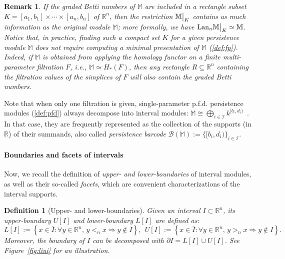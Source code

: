 \documentclass{article}
\newcommand{\field}{k}
\newcommand{\barcode}[1]{ {\mathcal B}\left(#1\right) }
\newcommand{\induced}[1]{\field^{#1}}
\newcommand{\R}{\mathbb{R}}
\newcommand{\Mbb}{\mathbb{M}}
\newcommand{\sln}{<_n}
\newcommand{\sgn}{>_n}
\newcommand{\upperb}[1]{ U[#1] }
\newcommand{\lowerb}[1]{ L[#1] }
\newcommand\restr[2]{{  \left.\kern-\nulldelimiterspace #1 \vphantom{\big|} \right|_{#2}  }}
\newtheorem{remark}{Remark}%
\newtheorem{definition}{Definition}%
\newcommand{\rebuttal}[1]{{ #1}}
\begin{document}
{	\begin{remark}\label{rmk:compacity_assumption}
		If the graded Betti numbers of $\Mbb$ are included in a rectangle subset $K = [a_1,b_1]\times \cdots \times [a_n,b_n]$ of $\R^n$,
		then the restriction $\restr \Mbb K$ contains as much information as the original module $\Mbb$; more formally, we have $\mathrm {Lan}_n \restr \Mbb K \simeq \Mbb$.
		Notice that, in practice, finding such a compact set $K$ for
		a given persistence module $\Mbb$
		does not require computing a minimal presentation of $\Mbb$
		(\cref{def:fp}). Indeed,
		if $\Mbb$ is obtained from applying the homology functor on a finite multi-parameter filtration $F$, i.e., $\Mbb \simeq H_*(F)$, then
		any rectangle $R\subseteq \R^n$ containing
		the filtration values of the simplices of $F$ will also contain
		the graded Betti numbers.
		\\
	\end{remark}

}

Note that when only one filtration is given, single-parameter \rebuttal{p.f.d.} persistence
modules (\cref{def:pfd}) always decompose into interval modules:
$\Mbb\cong\bigoplus_{i \in
\mathcal I} \induced{[b_i,d_i)}$~\cite[Theorem 2.8]{Chazal2016}. In that case,
they are frequently represented as the collection of the supports (in $\R$) of
their summands, also called {\em persistence barcode}
$\barcode{\Mbb}:=\{[b_i,d_i)\}_{i \in \mathcal I}$.

\paragraph*{Boundaries and facets of intervals}\label{app:defin}
Now, we recall the definition of {\em upper- and lower-boundaries} of interval modules, as well as their so-called {\em facets},
which are convenient characterizations of the interval supports. \\

\begin{definition}[Upper- and lower-boundaries]\label{def:upper_lower_boundaries}
	Given an interval $I\subset \R^n$, its \emph{upper-boundary} $\upperb{I}$ and \emph{lower-boundary} $\lowerb{I}$ are defined as:
	\begin{equation*}
		\lowerb{I}:= \left\{ x \in \bar I: \forall y\in\R^n,\, y \sln x \Rightarrow y \not\in I  \right\},\ \
		\upperb{I}:= \left\{ x \in \bar I: \forall y\in\R^n,\, y \sgn x \Rightarrow y \not\in I  \right\}.
	\end{equation*}
	Moreover, the boundary of ${I}$ can be decomposed with $\partial {I}=\lowerb{I} \cup \upperb{I}$.
	See Figure~\ref{fig:liui} for an illustration. \\
\end{definition}
\end{document}
